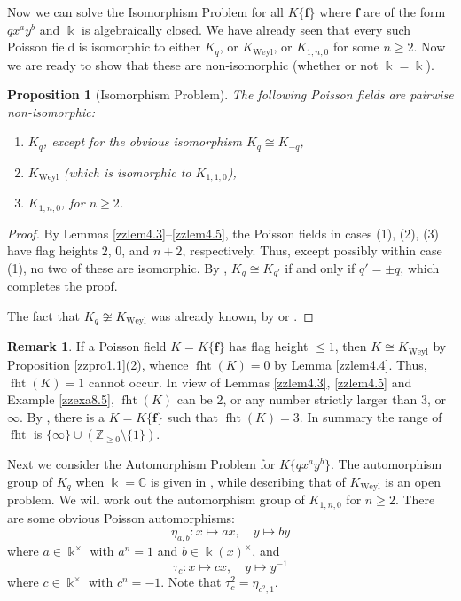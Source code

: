 \documentclass[12pt]{amsart}
\theoremstyle{plain}
\newtheorem{proposition}[theorem]{Proposition}
\numberwithin{theorem}{section}
\numberwithin{equation}{theorem}
\theoremstyle{definition}
\newtheorem{remark}[theorem]{Remark}
\DeclareMathOperator{\fht}{fht}
\newcommand \bff {{\mathbf{f}}}
\DeclareMathOperator{\Weyl}{Weyl}
\newcommand \Kweyl {K_{\Weyl}}
\newcommand \kx {\Bbbk^\times}
\newcommand \kbar {\overline{\Bbbk}}
\begin{document}
Now we can solve the Isomorphism Problem for all
$K\{\bff\}$ where $\bff$ are of the form 
$q x^a y^b$ and $\Bbbk$ is algebraically closed. We have already seen that every 
such Poisson field is isomorphic to either
$K_q$, or $\Kweyl$, or $K_{1,n,0}$ for some $n\geq 2$. 
Now we are ready to show that these are non-isomorphic (whether or not $\Bbbk = \kbar$).

\begin{proposition}  [Isomorphism Problem]  
\label{zzpro4.6}
The following Poisson fields are 
pairwise non-isomorphic:
\begin{enumerate}
\item[(1)]
$K_q$, except for the obvious isomorphism $K_{q}\cong K_{-q}$,
\item[(2)]
$\Kweyl$ {\rm{(}}which is isomorphic to $K_{1,1,0}${\rm{)}},
\item[(3)]
$K_{1,n,0}$, for $n\geq 2$.
\end{enumerate}
\end{proposition}

\begin{proof} By Lemmas \ref{zzlem4.3}--\ref{zzlem4.5}, the Poisson fields in cases (1), (2), (3) have flag heights $2$, $0$, and $n+2$, respectively.  Thus, except possibly within case (1), no two of these are isomorphic.  By \cite[Corollary 5.4]{GoLa}, $K_{q}\cong K_{q'}$ if and only if $q'=\pm q$, which completes the proof.

The fact that $K_{q}\not\cong \Kweyl$ was already known, by \cite[Corollary 5.3]{GoLa} or \cite[Corollary 5.9(2)]{HTWZ2}. 
\end{proof}

\begin{remark}  \label{zzrem4.7}  
If a Poisson field $K = K\{\bff\}$ has flag height $\le 1$, then $K \cong \Kweyl$ by Proposition \ref{zzpro1.1}(2), whence $\fht(K) = 0$ by Lemma \ref{zzlem4.4}.  Thus, $\fht(K) = 1$ cannot occur.  In view of Lemmas \ref{zzlem4.3}, \ref{zzlem4.5} and Example \ref{zzexa8.5}, 
$\fht(K)$ can be 2, or any number strictly 
larger than $3$, or $\infty$. By \cite{GZ2}, there is a $K=K\{\bff\}$ such that $\fht(K)=3$. In summary the range of $\fht$ is $\{\infty\} \cup ({\mathbb Z}_{\geq 0} \setminus \{1\})$.
\end{remark}

Next we consider the Automorphism 
Problem for $K\{q x^a y^b\}$. 
The automorphism group of $K_q$ when 
$\Bbbk = \mathbb{C}$ is given in 
\cite[Theorem 1]{Bl}, 
while describing that of $\Kweyl$ 
is an open problem. We will work out 
the automorphism group of $K_{1,n,0}$ 
for $n\geq 2$. There are some 
obvious Poisson automorphisms:
$$
\eta_{a,b}: x\mapsto a x, 
\quad y \mapsto b y
$$
where $a\in \Bbbk^{\times}$ 
with $a^n=1$ and $b\in 
\Bbbk(x)^{\times}$, and
$$\tau_c: x\mapsto cx, 
\quad y\mapsto y^{-1}$$
where $c \in \kx$ with $c^n=-1$. 
Note that $\tau_c^2=\eta_{c^2,1}$.
\end{document}
